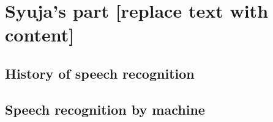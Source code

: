 \section{Syuja's part [replace text with content]}
\subsection{History of speech recognition}
\subsection{Speech recognition by machine}